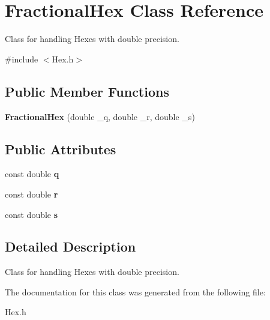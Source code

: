 \hypertarget{classFractionalHex}{}\section{Fractional\+Hex Class Reference}
\label{classFractionalHex}


Class for handling Hexes with double precision.  




{\ttfamily \#include $<$Hex.\+h$>$}

\subsection*{Public Member Functions}
\begin{DoxyCompactItemize}
\item 
{\bfseries Fractional\+Hex} (double \+\_\+q, double \+\_\+r, double \+\_\+s)\hypertarget{classFractionalHex_ac50319dd43bfcbae76a870571f6a59de}{}\label{classFractionalHex_ac50319dd43bfcbae76a870571f6a59de}

\end{DoxyCompactItemize}
\subsection*{Public Attributes}
\begin{DoxyCompactItemize}
\item 
const double {\bfseries q}\hypertarget{classFractionalHex_a96cede91d546d51e7eadc2f2f778e5ef}{}\label{classFractionalHex_a96cede91d546d51e7eadc2f2f778e5ef}

\item 
const double {\bfseries r}\hypertarget{classFractionalHex_a075d8600f225092f5e4e9cecbd2d470b}{}\label{classFractionalHex_a075d8600f225092f5e4e9cecbd2d470b}

\item 
const double {\bfseries s}\hypertarget{classFractionalHex_a8d83d40be09ee9803e19cd1c19b5bc5c}{}\label{classFractionalHex_a8d83d40be09ee9803e19cd1c19b5bc5c}

\end{DoxyCompactItemize}


\subsection{Detailed Description}
Class for handling Hexes with double precision. 

The documentation for this class was generated from the following file\+:\begin{DoxyCompactItemize}
\item 
Hex.\+h\end{DoxyCompactItemize}
